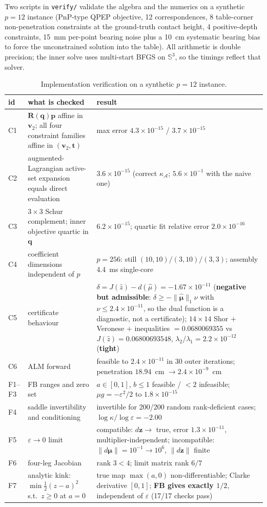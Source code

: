 Two scripts in \texttt{verify/} validate the algebra and the numerics on a synthetic $p=12$ instance (PnP-type QPEP objective, 12 correspondences, 8 table-corner non-penetration constraints at the ground-truth contact height, 4 positive-depth constraints, 15~mm per-point bearing noise plus a 10~cm systematic bearing bias to force the unconstrained solution into the table). All arithmetic is double precision; the inner solve uses multi-start BFGS on $\mathbb{S}^3$, so the timings reflect that solver.

\begin{table}[t]
\centering
\caption{Implementation verification on a synthetic $p=12$ instance.}
\label{tab:app_sanity}
\footnotesize
\setlength{\tabcolsep}{4pt}
\begin{tabular}{@{}p{0.8cm}p{7.6cm}p{7.4cm}@{}}
\toprule
id & what is checked & result \\
\midrule
C1 & $\mathbf R(\mathbf q)\mathbf p$ affine in $\mathbf v_2$; all four constraint families affine in $(\mathbf v_2,\mathbf t)$ & max error $4.3\times10^{-15}$ / $3.7\times10^{-15}$ \\
C2 & augmented-Lagrangian active-set expansion equals direct evaluation & $3.6\times10^{-15}$ (correct $\kappa_{\mathcal A}$; $5.6\times10^{-1}$ with the naive one) \\
C3 & $3\times3$ Schur complement; inner objective quartic in $\mathbf q$ & $6.2\times10^{-15}$; quartic fit relative error $2.0\times10^{-16}$ \\
C4 & coefficient dimensions independent of $p$ & $p=256$: still $(10,10)/(3,10)/(3,3)$; assembly 4.4~ms single-core \\
C5 & certificate behaviour & $\delta=J(\hat z)-d(\hat\mu)=-1.67\times10^{-11}$ (\textbf{negative but admissible}: $\delta\ge-\|\hat{\boldsymbol\mu}\|_1\nu$ with $\nu\le2.4\times10^{-11}$, so the dual function is a diagnostic, not a certificate); $14\times14$ Shor $+$ Veronese $+$ inequalities $=0.0680069355$ vs $J(\hat z)=0.06800693548$, $\lambda_2/\lambda_1=2.2\times10^{-12}$ (\textbf{tight}) \\
C6 & ALM forward & feasible to $2.4\times10^{-11}$ in 30 outer iterations; penetration $18.94$~cm $\to2.4\times10^{-9}$~cm \\
F1--F3 & FB ranges and zero set & $a\in[0,1]$, $b\le1$ feasible / $<2$ infeasible; $\mu g=-\varepsilon^2/2$ to $1.8\times10^{-15}$ \\
F4 & saddle invertibility and conditioning & invertible for 200/200 random rank-deficient cases; $\log\kappa/\log\varepsilon=-2.00$ \\
F5 & $\varepsilon\to0$ limit & compatible: $d\mathbf z\to$ true, error $1.3\times10^{-11}$, multiplier-independent; incompatible: $\|d\boldsymbol\mu\|=10^{-1}\to10^{6}$, $\|d\mathbf z\|$ finite \\
F6 & four-leg Jacobian & rank $3<4$; limit matrix rank $6/7$ \\
F7 & analytic kink: $\min\tfrac12(z-a)^2$ s.t.\ $z\ge0$ at $a=0$ & true map $\max(a,0)$ non-differentiable; Clarke derivative $[0,1]$; \textbf{FB gives exactly $1/2$}, independent of $\varepsilon$ (17/17 checks pass) \\
\bottomrule
\end{tabular}


\end{table}
